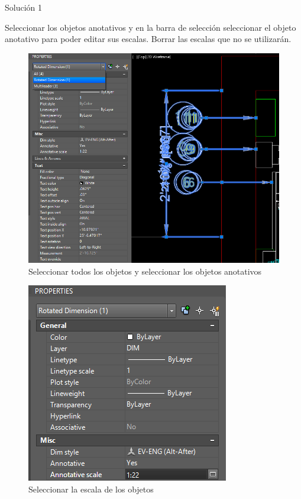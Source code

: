 \documentclass[12pt,letterpaper,final]{report}
\begin{document}
{\LARGE Solución 1}

Seleccionar los objetos anotativos y en la barra de selección seleccionar el objeto anotativo para poder editar sus escalas. Borrar las escalas que no se utilizarán.

\begin{figure}[H]
	\centering
	\includegraphics[width=0.95\linewidth, height=0.5\textheight,keepaspectratio]{Imagenes/apendice_anotative_04}
	\caption{Seleccionar todos los objetos y seleccionar los objetos anotativos}
	\label{fig:apendiceanotative04}
\end{figure}

\begin{figure}[H]
	\centering
	\includegraphics[width=0.85\linewidth, height=0.5\textheight,keepaspectratio]{Imagenes/apendice_anotative_05}
	\caption{Seleccionar la escala de los objetos}
	\label{fig:apendiceanotative05}
\end{figure}
\end{document}
